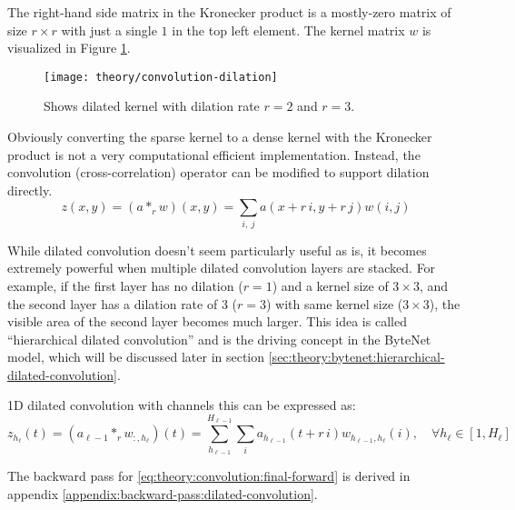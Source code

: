 The right-hand side matrix in the Kronecker product is a mostly-zero matrix of size $r \times r$ with just a single $1$ in the top left element. The kernel matrix $w$ is visualized in Figure \ref{fig:convolution:dilation}.

\begin{figure}[h]
	\centering
	\texttt{[image: theory/convolution-dilation]}
	\caption{Shows dilated kernel with dilation rate $r = 2$ and $r = 3$.}
	\label{fig:convolution:dilation}
\end{figure}

Obviously converting the sparse kernel to a dense kernel with the Kronecker product is not a very computational efficient implementation. Instead, the convolution (cross-correlation) operator can be modified to support dilation directly.
\begin{equation}
z(x, y) = (a *_r w)(x, y) = \sum_{i,\ j} a(x + r\, i, y + r\, j) w(i, j)
\end{equation}

While dilated convolution doesn't seem particularly useful as is, it becomes extremely powerful when multiple dilated convolution layers are stacked. For example, if the first layer has no dilation ($r = 1$) and a kernel size of $3 \times 3$, and the second layer has a dilation rate of 3 ($r = 3$) with same kernel size ($3 \times 3$), the visible area of the second layer becomes much larger. This idea is called ``hierarchical dilated convolution'' and is the driving concept in the ByteNet model, which will be discussed later in section \ref{sec:theory:bytenet:hierarchical-dilated-convolution}.

1D dilated convolution with channels this can be expressed as:
\begin{equation}
z_{h_\ell}(t) = (a_{\ell-1} *_r w_{:, h_\ell})(t) = \sum_{h_{\ell-1}}^{H_{\ell-1}} \sum_{i} a_{h_{\ell-1}}(t + r\,i) w_{h_{\ell-1}, h_\ell}(i), \quad \forall h_\ell \in [1, H_\ell]
\label{eq:theory:convolution:final-forward}
\end{equation}

The backward pass for \eqref{eq:theory:convolution:final-forward} is derived in appendix \ref{appendix:backward-pass:dilated-convolution}.
